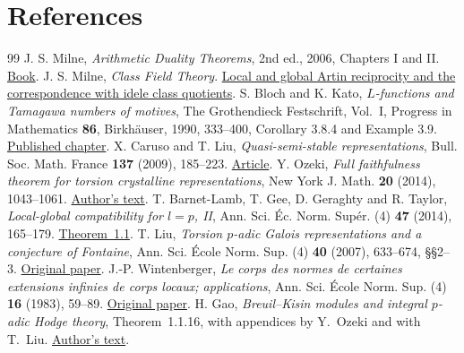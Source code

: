 \documentclass[a4paper,11pt]{article}
\theoremstyle{definition}
\theoremstyle{remark}
\numberwithin{equation}{section}
\begin{document}
\clearpage
\section{References}\label{nav:bibliography-III}
\begingroup{}\begin{thebibliography}{99}\small
{} J. S. Milne, \emph{Arithmetic Duality Theorems}, 2nd ed., 2006, Chapters I and II. \href{https://www.jmilne.org/math/Books/ADTnot.pdf}{Book}.
 J. S. Milne, \emph{Class Field Theory}. \href{https://www.jmilne.org/math/CourseNotes/CFT.pdf}{Local and global Artin reciprocity and the correspondence with idele class quotients}.
 S. Bloch and K. Kato, \emph{\(L\)-functions and Tamagawa numbers of motives}, The Grothendieck Festschrift, Vol.~I, Progress in Mathematics \textbf{86}, Birkh\"auser, 1990, 333--400, Corollary 3.8.4 and Example 3.9. \href{https://virtualmath1.stanford.edu/~conrad/BSDseminar/refs/BKTamagawa.pdf}{Published chapter}.
 X. Caruso and T. Liu, \emph{Quasi-semi-stable representations}, Bull. Soc. Math. France \textbf{137} (2009), 185--223. \href{https://www.numdam.org/item/BSMF_2009__137_2_185_0/}{Article}.
 Y. Ozeki, \emph{Full faithfulness theorem for torsion crystalline representations}, New York J. Math. \textbf{20} (2014), 1043--1061. \href{https://www.sci.kanagawa-u.ac.jp/math-phys/yozeki/pdf/torcris.pdf}{Author's text}.
 T. Barnet-Lamb, T. Gee, D. Geraghty and R. Taylor, \emph{Local-global compatibility for \(l=p\), II}, Ann. Sci. \'Ec. Norm. Sup\'er. (4) \textbf{47} (2014), 165--179. \href{https://virtualmath1.stanford.edu/~rltaylor/lg2.pdf}{Theorem~1.1}.
 T. Liu, \emph{Torsion \(p\)-adic Galois representations and a conjecture of Fontaine}, Ann. Sci. \'Ecole Norm. Sup. (4) \textbf{40} (2007), 633--674, \S\S2--3. \href{https://www.numdam.org/articles/10.1016/j.ansens.2007.05.002/}{Original paper}.
 J.-P. Wintenberger, \emph{Le corps des normes de certaines extensions infinies de corps locaux; applications}, Ann. Sci. \'Ecole Norm. Sup. (4) \textbf{16} (1983), 59--89. \href{https://www.numdam.org/item/ASENS_1983_4_16_1_59_0/}{Original paper}.
 H. Gao, \emph{Breuil--Kisin modules and integral \(p\)-adic Hodge theory}, Theorem~1.1.16, with appendices by Y.~Ozeki and with T.~Liu. \href{https://arxiv.org/pdf/1905.08555}{Author's text}.

\end{thebibliography}
\end{document}
